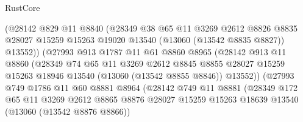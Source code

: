 \begin{lexlean}{RustCore}
\begin{coremodule}
                          (@28142
                            @829
                            @11
                            @8840
                            (@28349
                              @38
                              @65
                              @11
                              @3269
                              @2612
                              @8826
                              @8835
                              @28027
                              @15259
                              @15263
                              @19020
                              @13540
                              (@13060 (@13542 @8835 @8827))
                              @13552))
                          (@27993
                            @913
                            @1787
                            @11
                            @61
                            @8860
                            @8965
                            (@28142
                              @913
                              @11
                              @8860
                              (@28349
                                @74
                                @65
                                @11
                                @3269
                                @2612
                                @8845
                                @8855
                                @28027
                                @15259
                                @15263
                                @18946
                                @13540
                                (@13060 (@13542 @8855 @8846))
                                @13552))
                            (@27993
                              @749
                              @1786
                              @11
                              @60
                              @8881
                              @8964
                              (@28142
                                @749
                                @11
                                @8881
                                (@28349
                                  @172
                                  @65
                                  @11
                                  @3269
                                  @2612
                                  @8865
                                  @8876
                                  @28027
                                  @15259
                                  @15263
                                  @18639
                                  @13540
                                  (@13060 (@13542 @8876 @8866))

\end{coremodule}
\end{lexlean}
